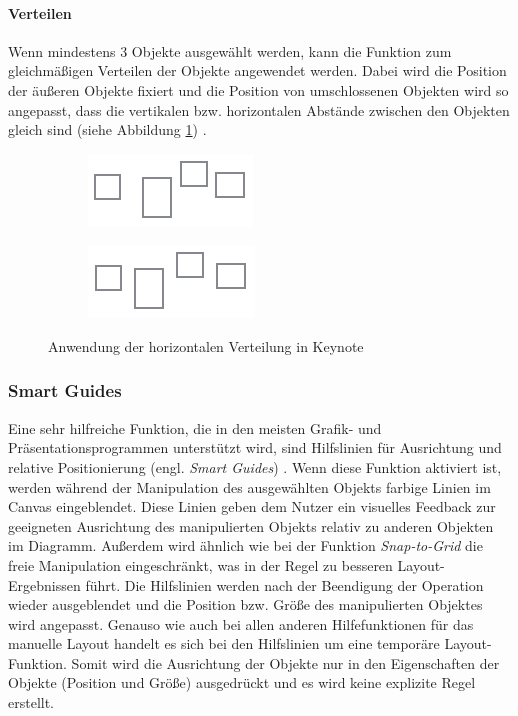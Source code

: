 \paragraph{Verteilen}

Wenn mindestens 3 Objekte ausgewählt werden, kann die Funktion zum gleichmäßigen Verteilen der Objekte angewendet werden. Dabei wird die Position der äußeren Objekte fixiert und die Position von umschlossenen Objekten wird so angepasst, dass die vertikalen bzw. horizontalen Abstände zwischen den Objekten gleich sind (siehe Abbildung \ref{fig:keynote-horizontal-distribution}) \cite{11Keynote}.

\begin{figure}[hbt]
    \newcommand{\subfigurewidth}{0.5\textwidth}
    \begin{subfigure}{\subfigurewidth}
        \centering
        \includegraphics{resources/keynote-horizontal-distribution-a}
        \caption{}
    \end{subfigure}
    \begin{subfigure}{\subfigurewidth}
        \centering
        \includegraphics{resources/keynote-horizontal-distribution-b}
        \caption{}
    \end{subfigure}
    \caption{Anwendung der horizontalen Verteilung in Keynote}
    \label{fig:keynote-horizontal-distribution}
\end{figure}

\subsubsection{Smart Guides}
\label{subsubsec:smart-guides}

Eine sehr hilfreiche Funktion, die in den meisten Grafik- und Präsentationsprogrammen unterstützt wird, sind Hilfslinien für Ausrichtung und relative Positionierung (engl. \textit{Smart Guides}) \cite{11Keynote}. Wenn diese Funktion aktiviert ist, werden während der Manipulation des ausgewählten Objekts farbige Linien im Canvas eingeblendet. Diese Linien geben dem Nutzer ein visuelles Feedback zur geeigneten Ausrichtung des manipulierten Objekts relativ zu anderen Objekten im Diagramm. Außerdem wird ähnlich wie bei der Funktion \textit{Snap-to-Grid} die freie Manipulation eingeschränkt, was in der Regel zu besseren Layout-Ergebnissen führt. Die Hilfslinien werden nach der Beendigung der Operation wieder ausgeblendet und die Position bzw. Größe des manipulierten Objektes wird angepasst. Genauso wie auch bei allen anderen Hilfefunktionen für das manuelle Layout handelt es sich bei den Hilfslinien um eine temporäre Layout-Funktion. Somit wird die Ausrichtung der Objekte nur in den Eigenschaften der Objekte (Position und Größe) ausgedrückt und es wird keine explizite Regel erstellt.

